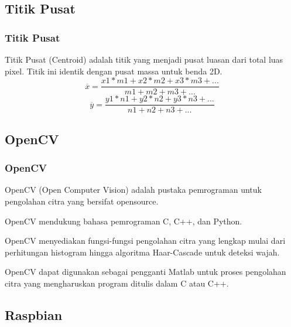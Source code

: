 \documentclass[table,dvipsnames]{beamer}
\begin{document}
\subsection{Titik Pusat}

\begin{frame}
\frametitle{Titik Pusat}
\begin{block}{}
Titik Pusat (Centroid) adalah titik yang menjadi pusat luasan dari total luas pixel.
Titik ini identik dengan pusat massa untuk benda 2D.
\begin{equation}
\overline{x}=\frac{x1*m1 + x2*m2 + x3*m3 +...}{m1 + m2 + m3 +...}
\end{equation}
\begin{equation}
\overline{y}=\frac{y1*n1 + y2*n2 + y3*n3 +...}{n1 + n2 + n3 +...}
\end{equation}
\end{block}
\end{frame}

\subsection{OpenCV}

\begin{frame}
\frametitle{OpenCV}
\begin{block}{}
OpenCV (Open Computer Vision) adalah pustaka pemrograman untuk pengolahan citra yang bersifat opensource.
\end{block}
\begin{block}{}
OpenCV mendukung bahasa pemrograman C, C++, dan Python.
\end{block}
\begin{block}{}
OpenCV menyediakan fungsi-fungsi pengolahan citra yang lengkap mulai dari perhitungan histogram hingga algoritma Haar-Cascade untuk deteksi wajah.
\end{block}
\begin{block}{}
OpenCV dapat digunakan sebagai pengganti Matlab untuk proses pengolahan citra yang mengharuskan program ditulis dalam C atau C++.
\end{block}
\end{frame}

\subsection{Raspbian}
\end{document}
